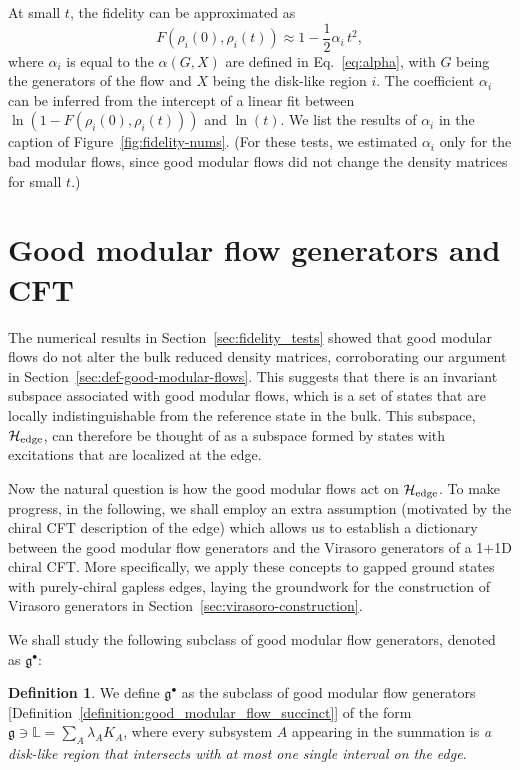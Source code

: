 \documentclass[12pt, nofootinbib]{article}
\theoremstyle{plain}
\theoremstyle{assumption}
\theoremstyle{definition}
\newtheorem{definition}[theorem]{Definition} %
\theoremstyle{plain}
\theoremstyle{plain}
\theoremstyle{plain}
\theoremstyle{plain}
\theoremstyle{plain}
\begin{document}
At small $t$, the fidelity can be approximated as 
\begin{equation}
    F(\rho_i(0),\rho_i(t)) \approx  1 - \frac{1}{2}\alpha_i \, t^2,
\end{equation} 
where $\alpha_i$ is equal to the $\alpha(G,X)$ are defined in Eq.~\eqref{eq:alpha}, with $G$ being the generators of the flow and $X$ being the disk-like region $i$. The coefficient $\alpha_i$ can be inferred from the intercept of a linear fit between $\ln (1-F(\rho_i(0), \rho_i(t)))$ and $\ln (t)$. We list the results of $\alpha_i$ in the caption of Figure~\ref{fig:fidelity-nums}. (For these tests, we estimated $\alpha_i$ only for the bad modular flows, since good modular flows did not change the density matrices for small $t$.) 


\section{Good modular flow generators and CFT}
\label{sec:chiral-cft}

The numerical results in Section~\ref{sec:fidelity_tests} showed that good modular flows do not alter the bulk reduced density matrices, corroborating our argument in Section~\ref{sec:def-good-modular-flows}. This suggests that there is an invariant subspace associated with good modular flows, which is a set of states that are locally indistinguishable from the reference state in the bulk. 
This subspace, $\mathcal{H}_{\rm edge}$, can therefore be thought of as a subspace formed by states with excitations that are localized at the edge. 

Now the natural question is how the good modular flows act on $\mathcal{H}_{\rm edge}$. To make progress, in the following, we shall employ an extra assumption (motivated by the chiral CFT description of the edge) which allows us to establish a dictionary between the good modular flow generators and the Virasoro generators of a 1+1D chiral CFT.  
More specifically, we apply these concepts to gapped ground states with purely-chiral gapless edges, laying the groundwork for the construction of Virasoro generators in Section~\ref{sec:virasoro-construction}. 

We shall study the following subclass of good modular flow generators, denoted as $\mathfrak{g}^{\bullet}$: 


\begin{definition}
\label{def:gdot}
We define $\mathfrak{g}^{\bullet}$ as the subclass of good modular flow generators [Definition~\ref{definition:good_modular_flow_succinct}] of the form $\mathfrak{g}\ni\mathbb{L} = \sum_{A} \lambda_A K_A$, where every subsystem $A$ appearing in the summation is \emph{a disk-like region that intersects with at most one single interval on the edge.} 
\end{definition}
\noindent
\end{document}

